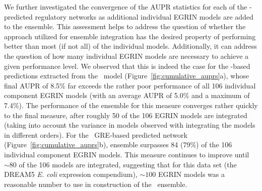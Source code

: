 We further investigated the convergence of the AUPR statistics for
each of the \egrine-predicted regulatory networks as additional
individual EGRIN models are added to the ensemble. This assessment
helps to address the question of whether the approach utilized for
ensemble integration has the desired property of performing better
than most (if not all) of the individual models. Additionally, it can
address the question of how many individual EGRIN models are necessary
to achieve a given performance level. We observed that this is indeed
the case for the \nwinf-based predictions extracted from the
\egrine\ model (Figure~\ref{fig:cumulative_auprs}a), whose final AUPR
of 8.5\% far exceeds the rather poor performance of all 106 individual
component EGRIN models (with an average AUPR of 5.0\% and a maximum of
7.4\%). The performance of the ensemble for this measure converges
rather quickly to the final measure, after roughly 50 of the 106 EGRIN
models are integrated (taking into account the variance in models
observed with integrating the models in different orders).  For the
\egrine\ GRE-based predicted network
(Figure~\ref{fig:cumulative_auprs}b), ensemble surpasses 84 (79\%) of
the 106 individual component EGRIN models. This measure continues to
improve until $\sim 80$ of the 106 models are integrated, suggesting
that for this data set (the DREAM5 {\it E. coli} expression
compendium), $\sim 100$ EGRIN models was a reasonable number to use in
construction of the \egrine\ ensemble.

